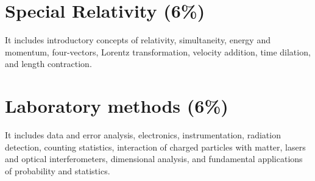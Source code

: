 \documentclass[12pt,a4paper]{article}
\begin{document}
\section{Special Relativity (6\%)}

It includes introductory concepts of relativity, simultaneity, energy and momentum, four-vectors, Lorentz transformation, velocity addition, time dilation, and length contraction.

\section{Laboratory methods (6\%)}

It includes data and error analysis, electronics, instrumentation, radiation detection, counting statistics, interaction of charged particles with matter, lasers and optical interferometers, dimensional analysis, and fundamental applications of probability and statistics.
\end{document}
